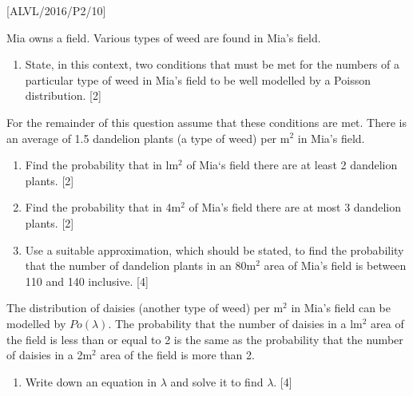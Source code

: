 \item {[}ALVL/2016/P2/10{]}

Mia owns a field. Various types of weed are found in Mia's field. 
\begin{enumerate}
\item State, in this context, two conditions that must be met for the numbers
of a particular type of weed in Mia's field to be well modelled by
a Poisson distribution. \hfill{} {[}2{]}
\end{enumerate}
For the remainder of this question assume that these conditions are
met. There is an average of 1.5 dandelion plants (a type of weed)
per $\mathrm{m}^{2}$ in Mia\textquoteright s field.
\begin{enumerate}
\item Find the probability that in l$\mathrm{m}^{2}$ of Mia\textquoteleft s
field there are at least 2 dandelion plants. \hfill{} {[}2{]}
\item Find the probability that in 4$\mathrm{m}^{2}$ of Mia\textquoteright s
field there are at most 3 dandelion plants. \hfill{}{[}2{]}
\item Use a suitable approximation, which should be stated, to find the
probability that the number of dandelion plants in an 80$\mathrm{m}^{2}$
area of Mia\textquoteright s field is between 110 and 140 inclusive.
\hfill{} {[}4{]}
\end{enumerate}
The distribution of daisies (another type of weed) per $\mathrm{m}^{2}$
in Mia\textquoteright s field can be modelled by $Po\left(\lambda\right)$.
The probability that the number of daisies in a l$\mathrm{m}^{2}$
area of the field is less than or equal to 2 is the same as the probability
that the number of daisies in a 2$\mathrm{m}^{2}$ area of the field
is more than 2.
\begin{enumerate}
\item Write down an equation in $\lambda$ and solve it to find $\lambda$.
\hfill{}{[}4{]}
\end{enumerate}
